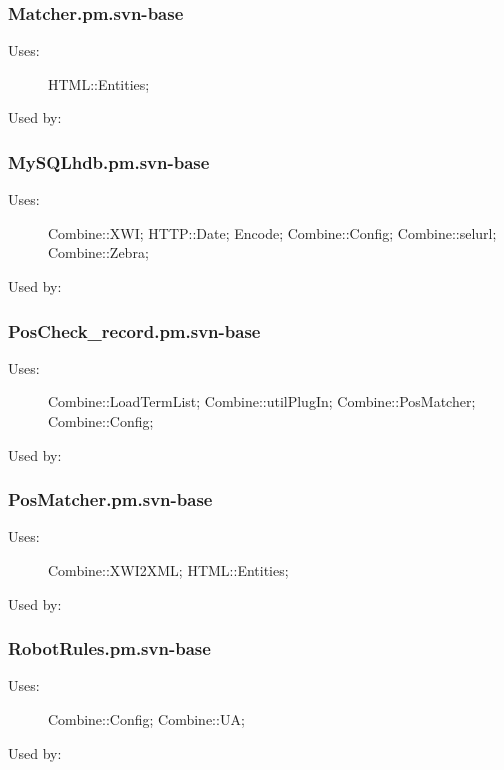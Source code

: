 \subsubsection{Matcher.pm.svn-base}
\begin{description}
\item[Uses:] HTML::Entities; 

\item[Used by:] 

\end{description}
\subsubsection{MySQLhdb.pm.svn-base}
\begin{description}
\item[Uses:] Combine::XWI; HTTP::Date; Encode; Combine::Config; Combine::selurl; Combine::Zebra; 

\item[Used by:] 

\end{description}
\subsubsection{PosCheck\_record.pm.svn-base}
\begin{description}
\item[Uses:] Combine::LoadTermList; Combine::utilPlugIn; Combine::PosMatcher; Combine::Config; 

\item[Used by:] 

\end{description}
\subsubsection{PosMatcher.pm.svn-base}
\begin{description}
\item[Uses:] Combine::XWI2XML; HTML::Entities; 

\item[Used by:] 

\end{description}
\subsubsection{RobotRules.pm.svn-base}
\begin{description}
\item[Uses:] Combine::Config; Combine::UA; 

\item[Used by:] 

\end{description}
